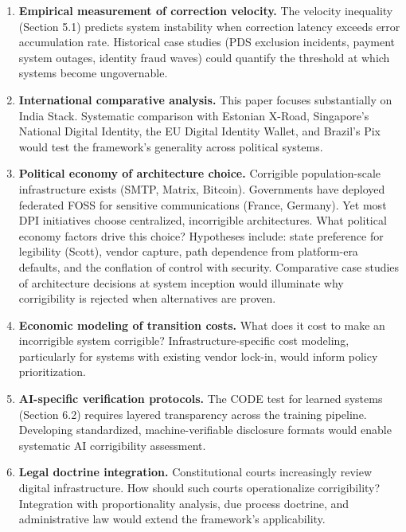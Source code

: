 \documentclass{article}
\begin{document}
\begin{enumerate}
    \item \textbf{Empirical measurement of correction velocity.} The velocity inequality (Section 5.1) predicts system instability when correction latency exceeds error accumulation rate. Historical case studies (PDS exclusion incidents, payment system outages, identity fraud waves) could quantify the threshold at which systems become ungovernable.

    \item \textbf{International comparative analysis.} This paper focuses substantially on India Stack. Systematic comparison with Estonian X-Road, Singapore's National Digital Identity, the EU Digital Identity Wallet, and Brazil's Pix would test the framework's generality across political systems.

    \item \textbf{Political economy of architecture choice.} Corrigible population-scale infrastructure exists (SMTP, Matrix, Bitcoin). Governments have deployed federated FOSS for sensitive communications (France, Germany). Yet most DPI initiatives choose centralized, incorrigible architectures. What political economy factors drive this choice? Hypotheses include: state preference for legibility (Scott), vendor capture, path dependence from platform-era defaults, and the conflation of control with security. Comparative case studies of architecture decisions at system inception would illuminate why corrigibility is rejected when alternatives are proven.

    \item \textbf{Economic modeling of transition costs.} What does it cost to make an incorrigible system corrigible? Infrastructure-specific cost modeling, particularly for systems with existing vendor lock-in, would inform policy prioritization.

    \item \textbf{AI-specific verification protocols.} The CODE test for learned systems (Section 6.2) requires layered transparency across the training pipeline. Developing standardized, machine-verifiable disclosure formats would enable systematic AI corrigibility assessment.

    \item \textbf{Legal doctrine integration.} Constitutional courts increasingly review digital infrastructure. How should such courts operationalize corrigibility? Integration with proportionality analysis, due process doctrine, and administrative law would extend the framework's applicability.


\end{enumerate}
\end{document}
